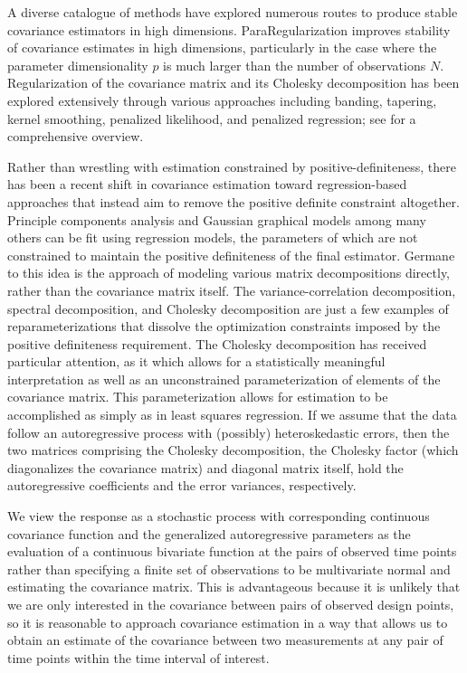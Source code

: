 \bigskip

A diverse catalogue of methods have explored numerous routes to produce stable covariance estimators in high dimensions. ParaRegularization improves stability of covariance estimates in high dimensions, particularly in the case where the parameter dimensionality $p$ is much larger than the number of observations $N$. Regularization of the covariance matrix and its Cholesky decomposition has been explored extensively through various approaches including banding, tapering, kernel smoothing, penalized likelihood, and penalized regression; see \cite{pourahmadi2011covariance} for a comprehensive overview. 

\bigskip

Rather than wrestling with estimation constrained by positive-definiteness, there has been a recent shift in covariance estimation toward regression-based approaches that instead aim to remove the positive definite constraint altogether. Principle components analysis and Gaussian graphical models among many others can be fit using regression models, the parameters of which are not constrained to maintain the positive definiteness of the final estimator. Germane to this idea is the approach of modeling various matrix decompositions directly, rather than the covariance matrix itself. The variance-correlation decomposition, spectral decomposition, and Cholesky decomposition are just a few examples of reparameterizations that dissolve the optimization constraints imposed by the positive definiteness requirement. The Cholesky decomposition has received particular attention, as it which allows for a statistically meaningful interpretation as well as an unconstrained parameterization of elements of the covariance matrix. This parameterization allows for estimation to be accomplished as simply as in least squares regression. If we assume that the data follow an autoregressive process with (possibly) heteroskedastic errors, then the two matrices comprising the Cholesky decomposition, the Cholesky factor (which diagonalizes the covariance matrix) and diagonal matrix itself, hold the autoregressive coefficients and the error variances, respectively.

\bigskip

We view the response as a stochastic process with corresponding continuous covariance function and the generalized autoregressive parameters as the evaluation of a continuous bivariate function at the pairs of observed time points rather than specifying a finite set of observations to be multivariate normal and estimating the covariance matrix. This is advantageous because it is unlikely that we are only interested in the covariance between pairs of observed design points, so it is reasonable to approach covariance estimation in a way that allows us to obtain an estimate of the covariance between two measurements at any pair of time points within the time interval of interest. 

